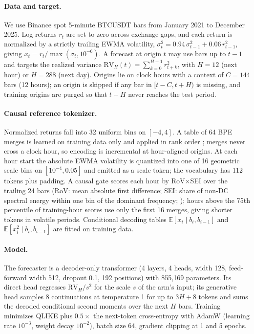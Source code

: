 \documentclass{article}
\begin{document}
\paragraph{Data and target.}
We use Binance spot 5-minute BTCUSDT bars from January 2021 to December 2025. Log returns $r_t$ are
set to zero across exchange gaps, and each return is normalized by a strictly trailing EWMA
volatility, $\sigma_t^2 = 0.94\,\sigma_{t-1}^2 + 0.06\,r_{t-1}^2$, giving
$x_t = r_t/\max(\sigma_t, 10^{-6})$. A forecast at origin $t$ may use bars up to $t-1$ and targets
the realized variance $\mathrm{RV}_H(t)=\sum_{k=0}^{H-1} r_{t+k}^2$, with $H=12$ (next hour) or
$H=288$ (next day). Origins lie on clock hours with a context of $C=144$ bars (12 hours); an origin
is skipped if any bar in $[t-C, t+H)$ is missing, and training origins are purged so that $t+H$
never reaches the test period.

\paragraph{Causal reference tokenizer.}
Normalized returns fall into 32 uniform bins on $[-4, 4]$. A table of 64 BPE merges is learned on
training data only and applied in rank order \citep{gotz2026bpe}; merges never cross a clock hour,
so encoding is incremental at hour-aligned origins. At each hour start the absolute EWMA volatility
is quantized into one of 16 geometric scale bins on $[10^{-4}, 0.05]$ and emitted as a scale token;
the vocabulary has 112 tokens plus padding. A causal gate scores each hour by RoV$\times$SEI over
the trailing 24 bars (RoV: mean absolute first difference; SEI: share of non-DC spectral energy
within one bin of the dominant frequency; \citealp{liao2026patk}); hours above the 75th percentile
of training-hour scores use only the first 16 merges, giving shorter tokens in volatile periods.
Conditional decoding tables $\mathbb{E}[x_i \mid b_i, b_{i-1}]$ and
$\mathbb{E}[x_i^2 \mid b_i, b_{i-1}]$ are fitted on training data.

\paragraph{Model.}
The forecaster is a decoder-only transformer (4 layers, 4 heads, width 128, feed-forward width 512,
dropout 0.1, 192 positions) with 855,169 parameters. Its direct head regresses $\mathrm{RV}_H/s^2$
for the scale $s$ of the arm's input; its generative head samples 8 continuations at temperature 1
for up to $3H+8$ tokens and sums the decoded conditional second moments over the next $H$ bars.
Training minimizes QLIKE plus $0.5\times$ the next-token cross-entropy with AdamW (learning rate
$10^{-3}$, weight decay $10^{-2}$), batch size 64, gradient clipping at 1 and 5 epochs.
\end{document}
